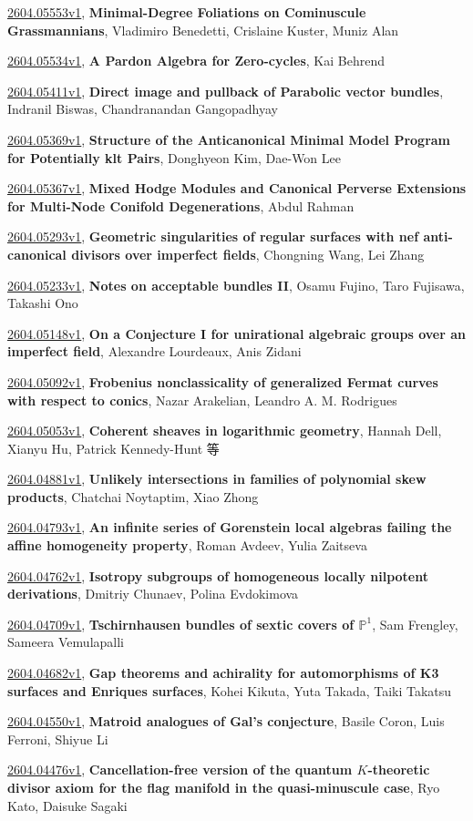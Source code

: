 \documentclass[9pt, a4paper]{article}
\theoremstyle{plain}
\theoremstyle{definition}
\theoremstyle{remark}
\newcommand{\arxiv}[3]{\href{https://arxiv.org/abs/#1}{#1}, \textbf{\textcolor{arxivblue}{#2}}, #3}
\begin{document}
\arxiv{2604.05553v1}{Minimal-Degree Foliations on Cominuscule Grassmannians}{Vladimiro Benedetti, Crislaine Kuster, Muniz Alan}

\arxiv{2604.05534v1}{A Pardon Algebra for Zero-cycles}{Kai Behrend}

\arxiv{2604.05411v1}{Direct image and pullback of Parabolic vector bundles}{Indranil Biswas, Chandranandan Gangopadhyay}

\arxiv{2604.05369v1}{Structure of the Anticanonical Minimal Model Program for Potentially klt Pairs}{Donghyeon Kim, Dae-Won Lee}

\arxiv{2604.05367v1}{Mixed Hodge Modules and Canonical Perverse Extensions for Multi-Node Conifold Degenerations}{Abdul Rahman}

\arxiv{2604.05293v1}{Geometric singularities of regular surfaces with nef anti-canonical divisors over imperfect fields}{Chongning Wang, Lei Zhang}

\arxiv{2604.05233v1}{Notes on acceptable bundles II}{Osamu Fujino, Taro Fujisawa, Takashi Ono}

\arxiv{2604.05148v1}{On a Conjecture I for unirational algebraic groups over an imperfect field}{Alexandre Lourdeaux, Anis Zidani}

\arxiv{2604.05092v1}{Frobenius nonclassicality of generalized Fermat curves with respect to conics}{Nazar Arakelian, Leandro A. M. Rodrigues}

\arxiv{2604.05053v1}{Coherent sheaves in logarithmic geometry}{Hannah Dell, Xianyu Hu, Patrick Kennedy-Hunt 等}

\arxiv{2604.04881v1}{Unlikely intersections in families of polynomial skew products}{Chatchai Noytaptim, Xiao Zhong}

\arxiv{2604.04793v1}{An infinite series of Gorenstein local algebras failing the affine homogeneity property}{Roman Avdeev, Yulia Zaitseva}

\arxiv{2604.04762v1}{Isotropy subgroups of homogeneous locally nilpotent derivations}{Dmitriy Chunaev, Polina Evdokimova}

\arxiv{2604.04709v1}{Tschirnhausen bundles of sextic covers of $\mathbb{P}^1$}{Sam Frengley, Sameera Vemulapalli}

\arxiv{2604.04682v1}{Gap theorems and achirality for automorphisms of K3 surfaces and Enriques surfaces}{Kohei Kikuta, Yuta Takada, Taiki Takatsu}

\arxiv{2604.04550v1}{Matroid analogues of Gal's conjecture}{Basile Coron, Luis Ferroni, Shiyue Li}

\arxiv{2604.04476v1}{Cancellation-free version of the quantum $K$-theoretic divisor axiom for the flag manifold in the quasi-minuscule case}{Ryo Kato, Daisuke Sagaki}
\end{document}
